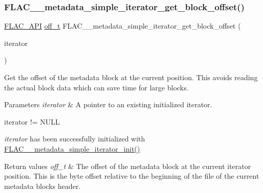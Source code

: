 \subsubsection{\texorpdfstring{F\+L\+A\+C\+\_\+\+\_\+metadata\+\_\+simple\+\_\+iterator\+\_\+get\+\_\+block\+\_\+offset()}{FLAC\_\_metadata\_simple\_iterator\_get\_block\_offset()}}
{\footnotesize\ttfamily \hyperlink{group__flac__export_ga56ca07df8a23310707732b1c0007d6f5}{F\+L\+A\+C\+\_\+\+A\+PI} \hyperlink{fshook_8h_ab219cf84f750cf36312b756cb82d5e5e}{off\+\_\+t} F\+L\+A\+C\+\_\+\+\_\+metadata\+\_\+simple\+\_\+iterator\+\_\+get\+\_\+block\+\_\+offset (\begin{DoxyParamCaption}\item[{\hyperlink{zconf_8h_a2c212835823e3c54a8ab6d95c652660e}{const} \hyperlink{group__flac__metadata__level1_ga6accccddbb867dfc2eece9ee3ffecb3a}{F\+L\+A\+C\+\_\+\+\_\+\+Metadata\+\_\+\+Simple\+Iterator} $\ast$}]{iterator }\end{DoxyParamCaption})}

Get the offset of the metadata block at the current position. This avoids reading the actual block data which can save time for large blocks.


\begin{DoxyParams}{Parameters}
{\em iterator} & A pointer to an existing initialized iterator.  
\begin{DoxyCode}
iterator != NULL 
\end{DoxyCode}
 {\itshape iterator} has been successfully initialized with \hyperlink{group__flac__metadata__level1_ga2a055cca4e6e06ae62517c8b0fa6e8a3}{F\+L\+A\+C\+\_\+\+\_\+metadata\+\_\+simple\+\_\+iterator\+\_\+init()} \\
\hline
\end{DoxyParams}

\begin{DoxyRetVals}{Return values}
{\em off\+\_\+t} & The offset of the metadata block at the current iterator position. This is the byte offset relative to the beginning of the file of the current metadata block\textquotesingle{}s header. \\
\hline
\end{DoxyRetVals}
\mbox{\label{group__flac__metadata__level1_ga4649a49d230ac8bfc3ec88f5196205bb}} 
